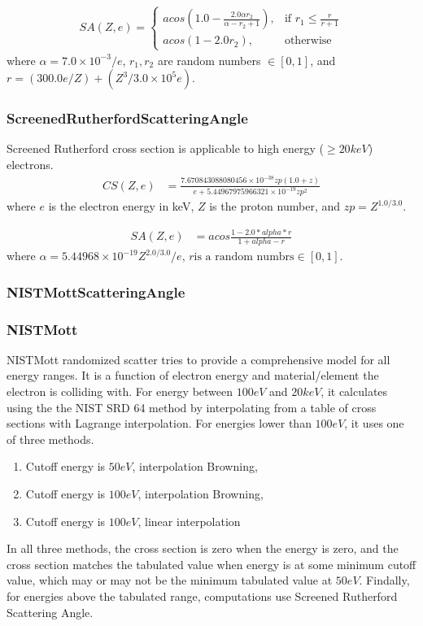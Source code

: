 \begin{align*}
    SA(Z, e)= 
\begin{cases}
    acos\left (1.0 - \frac{2.0 \alpha r_2}{\alpha - r_2 + 1}\right ),& \text{if } r_1 \leq \frac{r}{r+1}\\
    acos(1-2.0r_2),& \text{otherwise}
\end{cases}
\end{align*}
where $\alpha = 7.0\times 10^{-3}/e$, $r_1, r_2$ are random numbers $\in [0, 1]$, and $r = (300.0 e / Z) + (Z^3 / 3.0\times 10^5 e)$.

\subsubsection{ScreenedRutherfordScatteringAngle}
Screened Rutherford cross section is applicable to high energy ($\geq 20keV$) electrons. 
\begin{align*}
   CS(Z, e) &= \frac{7.670843088080456\times 10^{-38} zp (1.0 + z)}{e + 5.44967975966321\times 10^{-19} zp^2}
\end{align*}
where $e$ is the electron energy in keV, $Z$ is the proton number, and $zp = Z^{1.0/3.0}$.

\begin{align*}
    SA(Z, e) &= acos\frac{1 - 2.0 * alpha * r}{1 + alpha - r}
\end{align*}
where $\alpha = 5.44968\times 10^{-19} Z^{2.0 / 3.0} / e$, $r \text{is a random numbrs} \in [0, 1]$.

\subsubsection{NISTMottScatteringAngle}
\subsubsection{NISTMott}
NISTMott randomized scatter tries to provide a comprehensive model for all energy ranges. It is a function of electron energy and material/element the electron is colliding with. For energy between $100eV$ and $20keV$, it calculates using the the NIST SRD 64 method by interpolating from a table of cross sections with Lagrange interpolation. For energies lower than $100eV$, it uses one of three methods. 
\begin{enumerate}
\item Cutoff energy is $50 eV$, interpolation Browning,
\item Cutoff energy is $100 eV$, interpolation Browning,
\item Cutoff energy is $100 eV$, linear interpolation
\end{enumerate}
In all three methods, the cross section is zero when the energy is zero, and the cross section matches the tabulated value when energy is at some minimum cutoff value, which may or may not be the minimum tabulated value at $50eV$. Findally, for energies above the tabulated range, computations use Screened Rutherford Scattering Angle.

